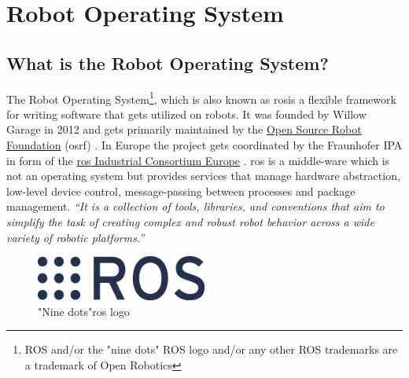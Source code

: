 
\chapter{Robot Operating System\authorA} \label{ref:ros}

\section{What is the Robot Operating System?}
The Robot Operating System\footnote{ROS and/or the "nine dots" ROS logo and/or any other ROS trademarks are a trademark of Open Robotics}, which is also known as \gls{ros}\texttrademark  is a flexible framework for writing software that gets utilized on robots. It was founded by Willow Garage in 2012 and gets primarily maintained by the \href{https://www.openrobotics.org/}{Open Source Robot Foundation} (\gls{osrf}) \cite{osrf}. In Europe the project gets coordinated by the Fraunhofer IPA in form of the \href{https://rosindustrial.org/ric-eu}{\gls{ros} Industrial Consortium Europe} \cite{rosice}. \gls{ros} is a middle-ware which is not an operating system but provides services that manage hardware abstraction, low-level device control, message-passing between processes and package management. \emph{\enquote{It is a collection of tools, libraries, and conventions that aim to simplify the task of creating complex and robust robot behavior across a wide variety of robotic platforms.}} \cite{aboutros} \newline
\begin{figure}[h]
	\centering
	\includegraphics[width=0.5\textwidth]{./media/images/ros_logo.eps}
  	\caption{"Nine dots"\texttrademark  \gls{ros} logo}
  	\label{rosstructure}
\end{figure}

